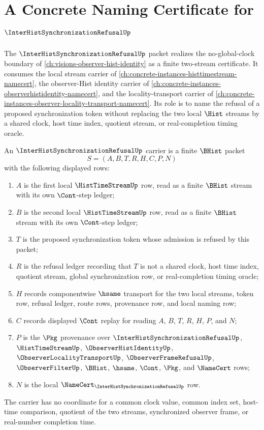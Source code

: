 \chapter{A Concrete Naming Certificate for $\InterHistSynchronizationRefusalUp$}
\label{ch:concrete-instances-inter-hist-synchronization-refusal-namecert}

The $\InterHistSynchronizationRefusalUp$ packet realizes the no-global-clock boundary of \autoref{ch:visions-observer-hist-identity} as a finite two-stream certificate. It consumes the local stream carrier of \autoref{ch:concrete-instances-histtimestream-namecert}, the observer-Hist identity carrier of \autoref{ch:concrete-instances-observerhistidentity-namecert}, and the locality-transport carrier of \autoref{ch:concrete-instances-observer-locality-transport-namecert}. Its role is to name the refusal of a proposed synchronization token without replacing the two local $\Hist$ streams by a shared clock, host time index, quotient stream, or real-completion timing oracle.

\begin{definition}
\label{def:inter-hist-synchronization-refusal-carrier}
An $\InterHistSynchronizationRefusalUp$ carrier is a finite $\BHist$ packet
$$
S=(A,B,T,R,H,C,P,N)
$$
with the following displayed rows:
\begin{enumerate}
\item $A$ is the first local $\HistTimeStreamUp$ row, read as a finite $\BHist$ stream with its own $\Cont$-step ledger;
\item $B$ is the second local $\HistTimeStreamUp$ row, read as a finite $\BHist$ stream with its own $\Cont$-step ledger;
\item $T$ is the proposed synchronization token whose admission is refused by this packet;
\item $R$ is the refusal ledger recording that $T$ is not a shared clock, host time index, quotient stream, global synchronization row, or real-completion timing oracle;
\item $H$ records componentwise $\hsame$ transport for the two local streams, token row, refusal ledger, route rows, provenance row, and local naming row;
\item $C$ records displayed $\Cont$ replay for reading $A$, $B$, $T$, $R$, $H$, $P$, and $N$;
\item $P$ is the $\Pkg$ provenance over $\InterHistSynchronizationRefusalUp$, $\HistTimeStreamUp$, $\ObserverHistIdentityUp$, $\ObserverLocalityTransportUp$, $\ObserverFrameRefusalUp$, $\ObserverFilterUp$, $\BHist$, $\hsame$, $\Cont$, $\Pkg$, and $\NameCert$ rows;
\item $N$ is the local $\NameCert_{\InterHistSynchronizationRefusalUp}$ row.
\end{enumerate}
The carrier has no coordinate for a common clock value, common index set, host-time comparison, quotient of the two streams, synchronized observer frame, or real-number completion time.
\end{definition}

